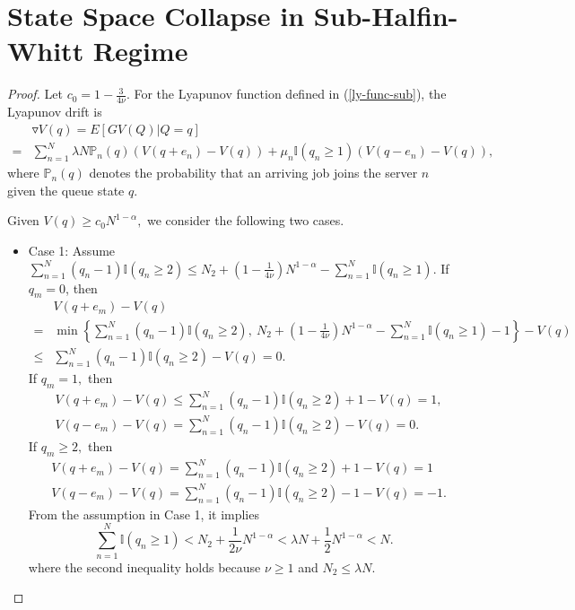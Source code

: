 \documentclass[11pt,oneside,letter]{article}
\begin{document}
\section{State Space Collapse in Sub-Halfin-Whitt Regime}
\sscsup*
\begin{proof}
Let $c_0=1-\frac{3}{4\nu}.$
For the Lyapunov function defined in (\ref{ly-func-sub}), the Lyapunov drift is
\begin{align*}
&\triangledown V(q)=E\left[GV(Q)|Q=q\right]\\
= &\sum_{n=1}^{N}\lambda N \mathbb P_n(q) (V(q + e_n) - V(q)) +  \mu_n \mathbb{I}(q_n\geq 1) (V(q - e_n)-V(q)), \nonumber
\end{align*}
{where $\mathbb P_n(q)$ denotes the probability that an arriving job joins the server $n$ given the queue state $q.$} 

Given $V(q)\geq c_0 {N^{1-\alpha}},$ we consider the following two cases.
\begin{itemize}
\item Case 1: Assume $\sum_{n=1}^{N} (q_n-1)\mathbb{I}(q_n\geq 2)\leq N_2+(1-\frac{1}{4\nu})N^{1-\alpha}- \sum_{n=1}^{N} \mathbb{I}(q_n\geq 1).$
If $q_m = 0$, then 
\begin{align*}
&V(q+e_m) -V(q) \\
=& \min\left\{\sum_{n=1}^{N} (q_n-1)\mathbb{I}(q_n\geq 2),~ N_2 + (1-\frac{1}{4\nu})N^{1-\alpha} - \sum_{n=1}^{N} \mathbb{I}(q_n\geq 1)-1\right\}-V(q)\\
\leq & \sum_{n=1}^{N} (q_n-1)\mathbb{I}(q_n\geq 2)-V(q) =0. 
\end{align*} 
If $q_m = 1,$ then 
\begin{align*}
&V(q+e_m)-V(q) \leq \sum_{n=1}^{N} (q_n-1) \mathbb{I}(q_n\geq 2) +1-V(q) =  1,\\
&V(q-e_m) -V(q) = \sum_{n=1}^{N} (q_n-1)\mathbb{I}(q_n\geq 2) -V(q)=0.
\end{align*} 
If $q_m \geq 2,$ then 
\begin{align*}
&V(q+e_m)-V(q)  = \sum_{n=1}^{ N} (q_n-1) \mathbb{I}(q_n\geq 2) +1 -V(q)=1\\
&V(q-e_m) - V(q)= \sum_{n=1}^{ N} (q_n-1)\mathbb{I}(q_n\geq 2) -1-V(q)=-1.
\end{align*} 
From the assumption in Case 1, it implies 
$$\sum_{n=1}^{N} \mathbb{I}(q_n\geq 1)< N_2+ \frac{1}{2\nu}N^{1-\alpha}<\lambda N + \frac{1}
{2}N^{1-\alpha}  <N.$$
where the second inequality holds because $\nu \geq 1$ and $N_2 \leq \lambda N.$ 


\end{itemize}
\end{proof}
\end{document}
